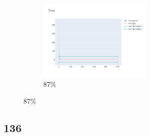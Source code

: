 \documentclass[12pt, fleqn]{report}                             %
\theoremstyle{break}                                            %
\begin{document}
\begin{figure}[ht!]
\begin{subfigure}[b]{0.4\linewidth}
          \includegraphics[width=0.6\textwidth]{Images/128/dia-d.png}
          \caption{87\%}
        \end{subfigure}
      \end{figure}


      \clearpage
      \subsection{136}
\end{document}
